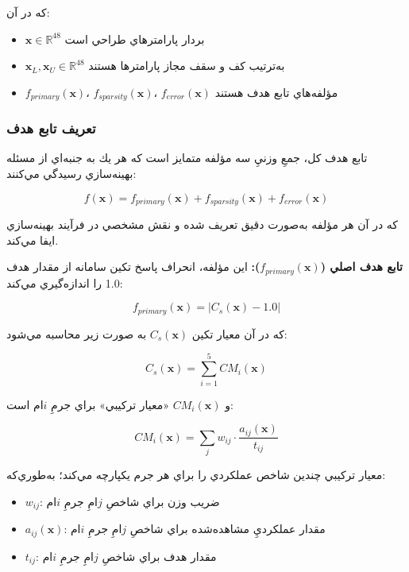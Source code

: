 كه در آن:
\begin{itemize}
    \item $\mathbf{x} \in \mathbb{R}^{48}$ بردار پارامترهاي طراحي است
    \item $\mathbf{x}_L, \mathbf{x}_U \in \mathbb{R}^{48}$ به‌ترتيب كف و سقف مجاز پارامترها هستند
    \item $f_{primary}(\mathbf{x})$، $f_{sparsity}(\mathbf{x})$، $f_{error}(\mathbf{x})$ مؤلفه‌هاي تابع هدف هستند
\end{itemize}

\subsubsection{تعريف تابع هدف}

تابع هدف كل، جمعِ وزنيِ سه مؤلفه متمايز است كه هر يك به جنبه‌اي از مسئله بهينه‌سازي رسيدگي مي‌كنند:

\begin{equation}\label{Eq.objective_function_detailed}
f(\mathbf{x}) = f_{primary}(\mathbf{x}) + f_{sparsity}(\mathbf{x}) + f_{error}(\mathbf{x})
\end{equation}

كه در آن هر مؤلفه به‌صورت دقيق تعريف شده و نقش مشخصي در فرآيند بهينه‌سازي ايفا مي‌كند.

\textbf{تابع هدف اصلي ($f_{primary}(\mathbf{x})$):} اين مؤلفه، انحراف پاسخ تكين سامانه از مقدار هدف 1.0 را اندازه‌گيري مي‌كند:

\begin{equation}\label{Eq.primary_objective_detailed}
f_{primary}(\mathbf{x}) = \left| C_s(\mathbf{x}) - 1.0 \right|
\end{equation}

كه در آن معيار تكين $C_s(\mathbf{x})$ به صورت زير محاسبه مي‌شود:

\begin{equation}\label{Eq.singular_response_detailed}
C_s(\mathbf{x}) = \sum_{i=1}^{5} CM_i(\mathbf{x})
\end{equation}

و $CM_i(\mathbf{x})$ «معيار تركيبي» براي جرمِ $i$ام است:

\begin{equation}\label{Eq.composite_measure_detailed}
CM_i(\mathbf{x}) = \sum_{j} w_{ij} \cdot \frac{a_{ij}(\mathbf{x})}{t_{ij}}
\end{equation}

معيار تركيبي چندين شاخص عملكردي را براي هر جرم يكپارچه مي‌كند؛ به‌طوري‌كه:
\begin{itemize}
    \item $w_{ij}$: ضريب وزن براي شاخصِ $j$امِ جرمِ $i$ام
    \item $a_{ij}(\mathbf{x})$: مقدار عملكرديِ مشاهده‌شده براي شاخصِ $j$امِ جرمِ $i$ام
    \item $t_{ij}$: مقدار هدف براي شاخصِ $j$امِ جرمِ $i$ام
\end{itemize}

